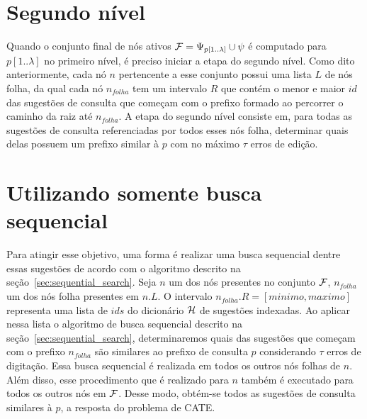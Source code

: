                 

\section{Segundo nível}
\label{sec:second_level}

Quando o conjunto final de nós ativos $\mathcal{F} = \Psi_{p[1..\lambda]} \cup \psi$ é computado para $p[1..\lambda]$ no primeiro nível, é preciso iniciar a etapa do segundo nível. Como dito anteriormente, cada nó $n$ pertencente a esse conjunto possui uma lista $L$ de nós folha, da qual cada nó $n_{folha}$ tem um intervalo $R$ que contém o menor e maior $id$ das sugestões de consulta que começam com o prefixo formado ao percorrer o caminho da raiz até $n_{folha}$. A etapa do segundo nível consiste em, para todas as sugestões de consulta referenciadas por todos esses nós folha, determinar quais delas possuem um prefixo similar à $p$ com no máximo $\tau$ erros de edição. 

\section{Utilizando somente busca sequencial} 
\label{sec:IP2L}

Para atingir esse objetivo, uma forma é realizar uma busca sequencial dentre essas sugestões de acordo com o algoritmo descrito na seção~\ref{sec:sequential_search}. Seja $n$ um dos nós presentes no conjunto $\mathcal{F}$, $n_{folha}$ um dos nós folha presentes em $n.L$. O intervalo $n_{folha}.R = [minimo, maximo]$ representa uma lista de $ids$ do dicionário $\mathcal{H}$ de sugestões indexadas. Ao aplicar nessa lista o algoritmo de busca sequencial descrito na seção~\ref{sec:sequential_search}, determinaremos quais das sugestões que começam com o prefixo $n_{folha}$ são similares ao prefixo de consulta $p$ considerando $\tau$ erros de digitação. Essa busca sequencial é realizada em todos os outros nós folhas de $n$. Além disso, esse procedimento que é realizado para $n$ também é executado para todos os outros nós em $\mathcal{F}$. Desse modo, obtém-se todos as sugestões de consulta similares à $p$, a resposta do problema de CATE.

